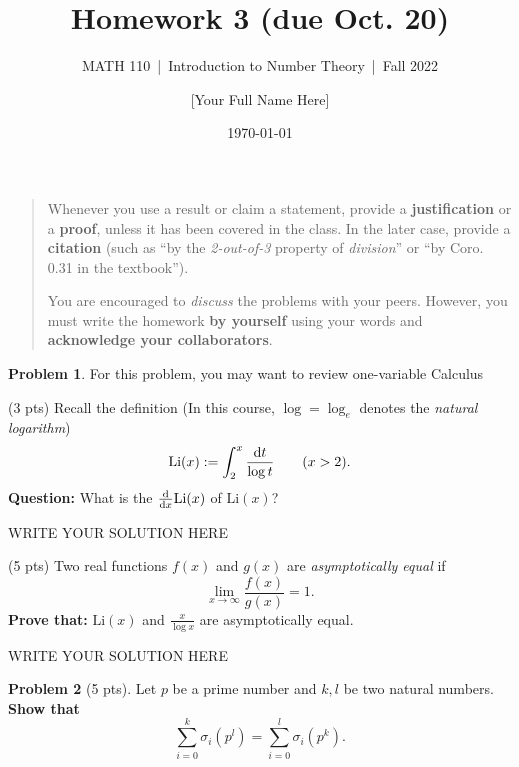 \documentclass[11pt]{article}
\title{Homework 3 (due Oct. 20)}
\author{[Your Full Name Here]}
\subtitle{MATH 110~|~Introduction to Number Theory~|~Fall 2022}
\date{\today}
\theoremstyle{plain}
\theoremstyle{definition}
\newtheorem{problem}{Problem}
\theoremstyle{remark}
\numberwithin{equation}{problem}
\begin{document}
\maketitle

\begin{quotation}
	Whenever you use a result or claim a statement, provide a \textbf{justification} or a \textbf{proof}, unless it has been covered in the class. In the later case, provide a \textbf{citation} (such as ``by the \emph{2-out-of-3} property of \emph{division}'' or ``by Coro. 0.31 in the textbook'').

	You are encouraged to \emph{discuss} the problems with your peers. However, you must write the homework \textbf{by yourself} using your words and \textbf{acknowledge your collaborators}.
\end{quotation}

\begin{problem}
	For this problem, you may want to review one-variable Calculus
	\begin{listinprob}
		\item (3 pts) Recall the definition (In this course, $\log=\log_{e}$ denotes the \emph{natural logarithm})
									\[
										\mathrm{Li}(x):=
											\int_{2}^{x}\frac{\odif{t}}{\log{t}}
										\qquad (x>2).
									\]
									\textbf{Question:} What is the  $\odv*{}{x}\mathrm{Li}(x)$ of $\mathrm{Li}(x)$?
		
\begin{solution} %
WRITE YOUR SOLUTION HERE
\end{solution}\clearpage %

		\item (5 pts) Two real functions $f(x)$ and $g(x)$ are \emph{asymptotically equal} if 
		\[
			\lim_{x\to\infty} \frac{f(x)}{g(x)} = 1.
		\]
		\textbf{Prove that:} $\mathrm{Li}(x)$ and $\frac{x}{\log{x}}$ are asymptotically equal.
	\end{listinprob}
\end{problem}
		
\begin{solution} %
WRITE YOUR SOLUTION HERE
\end{solution}\clearpage %


\begin{problem}[5 pts]
	Let $p$ be a prime number and $k,l$ be two natural numbers. 
	\textbf{Show that} 
	\[
		\sum_{i=0}^{k}\sigma_{i}(p^l) = \sum_{i=0}^{l}\sigma_{i}(p^k).
	\]
\end{problem}
		
\end{document}
